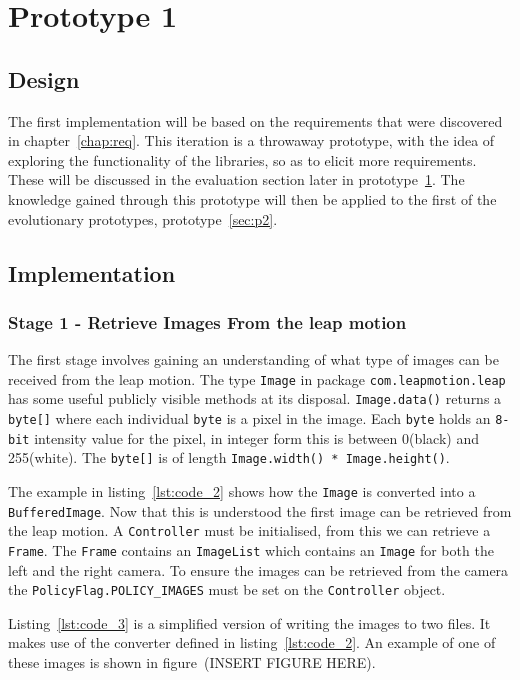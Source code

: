 \documentclass[11pt,oneside]{report}
\newcommand\code[1]{\texttt{#1}}
\begin{document}
	\section{Prototype 1}\label{sec:p1}
		\subsection{Design}
		The first implementation will be based on the requirements that were discovered in chapter~\ref{chap:req}.
		This iteration is a throwaway prototype, with the idea of exploring the functionality of the libraries, so as to elicit more requirements.
		These will be discussed in the evaluation section later in prototype~\ref{sec:p1}.
		The knowledge gained through this prototype will then be applied to the first of the evolutionary prototypes, prototype~\ref{sec:p2}.
		\subsection{Implementation}
		\subsubsection{Stage 1 - Retrieve Images From the leap motion}
		The first stage involves gaining an understanding of what type of images can be received from the leap motion.
		The type \code{Image} in package \code{com.leapmotion.leap} has some useful publicly visible methods at its disposal.
		\code{Image.data()} returns a \code{byte[]} where each individual \code{byte} is a pixel in the image.
		Each \code{byte} holds an \code{8-bit} intensity value for the pixel, in integer form this is between 0(black) and 255(white).
		The \code{byte[]} is of length \code{Image.width() * Image.height()}.
		
		The example in listing~\ref{lst:code_2} shows how the \code{Image} is converted into a \code{BufferedImage}.
		Now that this is understood the first image can be retrieved from the leap motion.
		A \code{Controller} must be initialised, from this we can retrieve a \code{Frame}.
		The \code{Frame} contains an \code{ImageList} which contains an \code{Image} for both the left and the right camera.
		To ensure the images can be retrieved from the camera the \code{PolicyFlag.POLICY\_IMAGES} must be set on the \code{Controller} object.
		
		Listing~\ref{lst:code_3} is a simplified version of writing the images to two files.
		It makes use of the converter defined in listing~\ref{lst:code_2}.
		An example of one of these images is shown in figure~(INSERT FIGURE HERE). %
			
			
\end{document}
